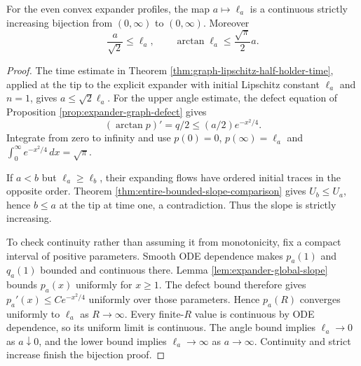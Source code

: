 \begin{lemma}\label{lem:expander-tip-slope-bijection}
For the even convex expander profiles, the map $a\mapsto\ell_a$ is a continuous strictly increasing bijection from $(0,\infty)$ to $(0,\infty)$. Moreover
\[
 \frac{a}{\sqrt2}\leq\ell_a,
 \qquad \arctan\ell_a\leq\frac{\sqrt\pi}{2}a.
\]
\end{lemma}
\begin{proof}
The time estimate in Theorem \ref{thm:graph-lipschitz-half-holder-time}, applied at the tip to the explicit expander with initial Lipschitz constant $\ell_a$ and $n=1$, gives $a\leq\sqrt2\ell_a$. For the upper angle estimate, the defect equation of Proposition \ref{prop:expander-graph-defect} gives
\[
 (\arctan p)'=q/2\leq(a/2)e^{-x^2/4}.
\]
Integrate from zero to infinity and use $p(0)=0$, $p(\infty)=\ell_a$ and $\int_0^\infty e^{-x^2/4}\,dx=\sqrt\pi$.

If $a<b$ but $\ell_a\geq\ell_b$, their expanding flows have ordered initial traces in the opposite order. Theorem \ref{thm:entire-bounded-slope-comparison} gives $U_b\leq U_a$, hence $b\leq a$ at the tip at time one, a contradiction. Thus the slope is strictly increasing.

To check continuity rather than assuming it from monotonicity, fix a compact interval of positive parameters. Smooth ODE dependence makes $p_a(1)$ and $q_a(1)$ bounded and continuous there. Lemma \ref{lem:expander-global-slope} bounds $p_a(x)$ uniformly for $x\geq1$. The defect bound therefore gives $p_a'(x)\leq C e^{-x^2/4}$ uniformly over those parameters. Hence $p_a(R)$ converges uniformly to $\ell_a$ as $R\to\infty$. Every finite-$R$ value is continuous by ODE dependence, so its uniform limit is continuous. The angle bound implies $\ell_a\to0$ as $a\downarrow0$, and the lower bound implies $\ell_a\to\infty$ as $a\to\infty$. Continuity and strict increase finish the bijection proof.
\end{proof}

